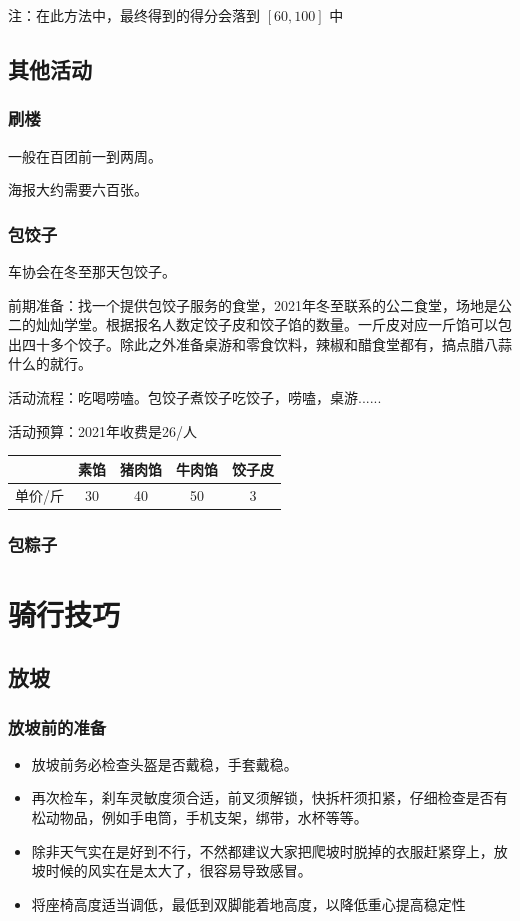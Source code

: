 \documentclass{ctexbook}
\begin{document}
注：在此方法中，最终得到的得分会落到 $[60,100]$ 中

\section{其他活动}
\subsection{刷楼}
一般在百团前一到两周。

海报大约需要六百张。

\subsection{包饺子}
车协会在冬至那天包饺子。

前期准备：找一个提供包饺子服务的食堂，2021年冬至联系的公二食堂，场地是公二的灿灿学堂。根据报名人数定饺子皮和饺子馅的数量。一斤皮对应一斤馅可以包出四十多个饺子。除此之外准备桌游和零食饮料，辣椒和醋食堂都有，搞点腊八蒜什么的就行。

活动流程：吃喝唠嗑。包饺子煮饺子吃饺子，唠嗑，桌游......

活动预算：2021年收费是26/人
\begin{table}[H]
    \centering
    \begin{tabular}{|c|c|c|c|c|}
    \hline
    ~  & 素馅 & 猪肉馅 & 牛肉馅 & 饺子皮 \\ \hline
    单价/斤 & 30 & 40  & 50  & 3   \\ \hline
    \end{tabular}
\end{table}

\subsection{包粽子}

\chapter{骑行技巧}
\section{放坡}
\subsection{放坡前的准备}
\begin{itemize}
    \item 放坡前务必检查头盔是否戴稳，手套戴稳。
    \item 再次检车，刹车灵敏度须合适，前叉须解锁，快拆杆须扣紧，仔细检查是否有松动物品，例如手电筒，手机支架，绑带，水杯等等。
    \item 除非天气实在是好到不行，不然都建议大家把爬坡时脱掉的衣服赶紧穿上，放坡时候的风实在是太大了，很容易导致感冒。
    \item 将座椅高度适当调低，最低到双脚能着地高度，以降低重心提高稳定性
\end{itemize}
\end{document}
